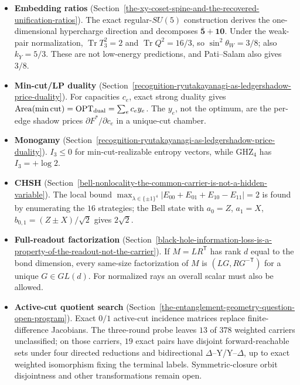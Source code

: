 \begin{itemize}\tightlist
\item \textbf{Embedding ratios} (Section~\ref{the-xy-coset-spine-and-the-recovered-unification-ratios}). The exact
  regular-\(SU(5)\) construction derives the one-dimensional hypercharge direction and decomposes
  \(\overline{\mathbf5}+\mathbf{10}\). Under the weak-pair normalization, \(\operatorname{Tr}T_3^2=2\) and
  \(\operatorname{Tr}Q^2=16/3\), so \(\sin^2\theta_W=3/8\); also \(k_Y=5/3\). These are not low-energy predictions,
  and Pati--Salam also gives \(3/8\).
\item \textbf{Min-cut/LP duality} (Section~\ref{recognition-ryutakayanagi-as-ledgershadow-price-duality}). For
  capacities \(c_e\), exact strong duality gives
  \(\operatorname{Area}(\min\mathrm{cut})=\operatorname{OPT}_{\rm dual}=\sum_e c_e y_e\). The \(y_e\), not the optimum,
  are the per-edge shadow prices \(\partial F^*/\partial c_e\) in a unique-cut chamber.
\item \textbf{Monogamy} (Section~\ref{recognition-ryutakayanagi-as-ledgershadow-price-duality}). \(I_3\le0\) for
  min-cut-realizable entropy vectors, while GHZ\(_4\) has \(I_3=+\log2\).
\item \textbf{CHSH} (Section~\ref{bell-nonlocality-the-common-carrier-is-not-a-hidden-variable}). The local bound
  \(\max_{\lambda\in\{\pm1\}^4}|E_{00}+E_{01}+E_{10}-E_{11}|=2\) is found by enumerating the \(16\) strategies; the Bell
  state with \(a_0=Z\), \(a_1=X\), \(b_{0,1}=(Z\pm X)/\sqrt2\) gives \(2\sqrt2\).
\item \textbf{Full-readout factorization} (Section~\ref{black-hole-information-loss-is-a-property-of-the-readout-not-the-carrier}).
  If \(M=LR^{\mathsf T}\) has rank \(d\) equal to the bond dimension, every same-size factorization of \(M\) is
  \((LG,RG^{-\mathsf T})\) for a unique \(G\in GL(d)\). For normalized rays an overall scalar must also be allowed.
\item \textbf{Active-cut quotient search} (Section~\ref{the-entanglement-geometry-question-open-program}). Exact \(0/1\)
  active-cut incidence matrices replace finite-difference Jacobians. The three-round probe leaves \(13\) of \(378\)
  weighted carriers unclassified; on those carriers, \(19\) exact pairs have disjoint forward-reachable sets under four
  directed reductions and bidirectional \(\Delta\)--Y/Y--\(\Delta\), up to exact weighted isomorphism fixing the
  terminal labels. Symmetric-closure orbit disjointness and other transformations remain open.
\end{itemize}
